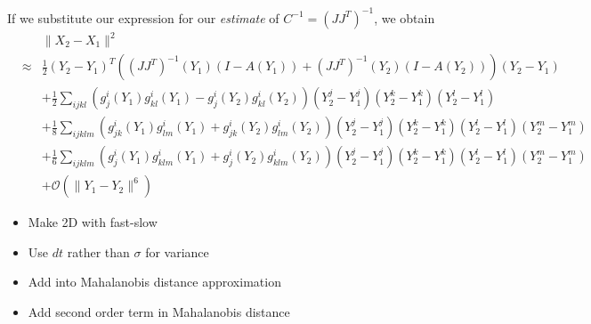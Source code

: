 \documentclass[12pt]{article}
\begin{document}
If we substitute our expression for our {\em estimate} of $C^{-1} = (J J^T) ^{-1}$, we obtain
\begin{eqnarray}
&&\| X_2 - X_1 \|^2 \\
&\approx&  \frac{1}{2} (Y_2 - Y_1 )^T ((J J^T)^{-1} (Y_1) (I-A(Y_1))+ (J J^T)^{-1}(Y_2) (I-A(Y_2))) (Y_2 - Y_1 ) \\
&& + \frac{1}{2} \sum_{ijkl} \left( g_j^i (Y_1) g^i_{kl} (Y_1) - g_j^i (Y_2) g^i_{kl} (Y_2) \right) (Y^j_2 - Y^j_1 )  (Y^k_2 - Y^k_1)(Y^l_2 - Y^l_1) \\
&& + \frac{1}{8} \sum_{ijklm}  \left( g^i_{jk} (Y_1) g^i_{lm} (Y_1) + g^i_{jk} (Y_2) g^i_{lm} (Y_2)  \right) (Y^j_2 - Y^j_1) (Y^k_2 - Y^k_1) (Y^l_2 - Y^l_1) (Y^m_2 - Y^m_1) \\
&& + \frac{1}{6} \sum_{ijklm}  \left( g^i_{j} (Y_1) g^i_{klm} (Y_1) + g^i_{j} (Y_2) g^i_{klm} (Y_2)  \right)(Y^j_2 - Y^j_1) (Y^k_2 - Y^k_1) (Y^l_2 - Y^l_1) (Y^m_2 - Y^m_1) \\
&& + \mathcal{O} (\|Y_1 - Y_2 \|^6 ) 
\end{eqnarray}

\begin{itemize}
\item Make 2D with fast-slow
\item Use $dt$ rather than $\sigma$ for variance
\item Add into Mahalanobis distance approximation
\item Add second order term in Mahalanobis distance
\end{itemize}
\end{document}
